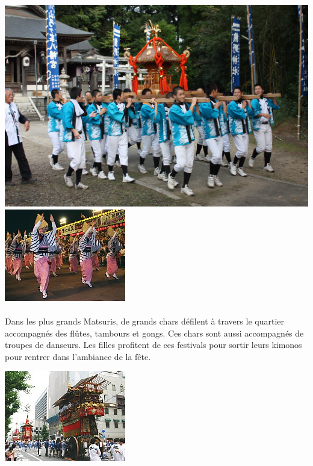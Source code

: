 \begin{center}
	\includegraphics[scale=0.07]{mikoshi.jpg}
	\includegraphics[scale=1.3]{odori.jpg}
\end{center}

\paragraph{} Dans les plus grands Matsuris, de grands chars défilent à travers
le quartier accompagnés des flûtes, tambours et gongs. Ces chars sont aussi
accompagnés de troupes de danseurs. Les filles profitent de ces festivals pour
sortir leurs kimonos pour rentrer dans l'ambiance de la fête.

\begin{center}
	\includegraphics[scale=1.3]{gion.jpg}
\end{center}

\newpage

